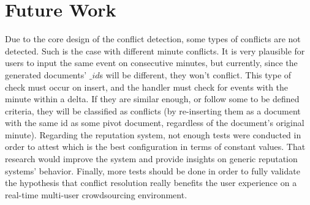 \section{Future Work} \label{sec:conc-future-work}

Due to the core design of the conflict detection, some types of conflicts are not detected. Such is the case with different minute conflicts. It is very plausible for users to input the same event on consecutive minutes, but currently, since the generated documents' $\_id$s will be different, they won't conflict. This type of check must occur on insert, and the handler must check for events with the minute within a delta. If they are similar enough, or follow some to be defined criteria, they will be classified as conflicts (by re-inserting them as a document with the same id as some pivot document, regardless of the document's original minute). Regarding the reputation system, not enough tests were conducted in order to attest which is the best configuration in terms of constant values. That research would improve the system and provide insights on generic reputation systems' behavior. Finally, more tests should be done in order to fully validate the hypothesis that conflict resolution really benefits the user experience on a real-time multi-user crowdsourcing environment.


\vspace*{12mm}